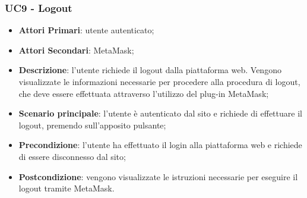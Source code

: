 \subsubsection{UC9 - Logout}
\begin{itemize}
	\item \textbf{Attori Primari}:
	utente autenticato;
	\item \textbf{Attori Secondari}:
	MetaMask\glo;
	\item \textbf{Descrizione}: l'utente richiede il logout dalla piattaforma web. Vengono visualizzate le informazioni necessarie per procedere alla procedura di logout, che deve essere effettuata attraverso l'utilizzo del plug-in MetaMask\glo;
	\item \textbf{Scenario principale}: l'utente è autenticato dal sito e richiede di effettuare il logout, premendo sull'apposito pulsante;
	\item \textbf{Precondizione}: l'utente ha effettuato il login alla piattaforma web e richiede di essere disconnesso dal sito;
	\item \textbf{Postcondizione}: vengono visualizzate le istruzioni necessarie per eseguire il logout tramite MetaMask\glo. 
\end{itemize}

